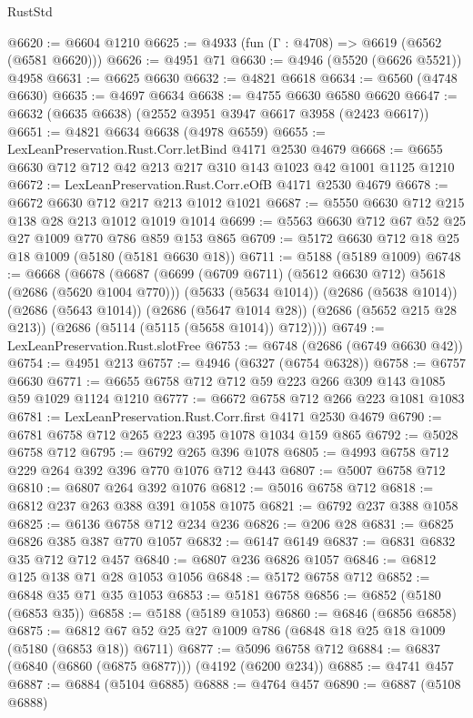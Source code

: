 \begin{lexlean}{RustStd}
\begin{coremodule}
@6620 := @6604 @1210
@6625 := @4933 (fun (Γ : @4708) => @6619 (@6562 (@6581 @6620)))
@6626 := @4951 @71
@6630 := @4946 (@5520 (@6626 @5521)) @4958
@6631 := @6625 @6630
@6632 := @4821 @6618
@6634 := @6560 (@4748 @6630)
@6635 := @4697 @6634
@6638 := @4755 @6630 @6580 @6620
@6647 := @6632 (@6635 @6638) (@2552 @3951 @3947 @6617 @3958 (@2423 @6617))
@6651 := @4821 @6634 @6638 (@4978 @6559)
@6655 := LexLeanPreservation.Rust.Corr.letBind @4171 @2530 @4679
@6668 := @6655 @6630 @712 @712 @42 @213 @217 @310 @143 @1023 @42 @1001 @1125 @1210
@6672 := LexLeanPreservation.Rust.Corr.eOfB @4171 @2530 @4679
@6678 := @6672 @6630 @712 @217 @213 @1012 @1021
@6687 := @5550 @6630 @712 @215 @138 @28 @213 @1012 @1019 @1014
@6699 := @5563 @6630 @712 @67 @52 @25 @27 @1009 @770 @786 @859 @153 @865
@6709 := @5172 @6630 @712 @18 @25 @18 @1009 (@5180 (@5181 @6630 @18))
@6711 := @5188 (@5189 @1009)
@6748 := @6668
    (@6678
      (@6687
        (@6699 (@6709 @6711) (@5612 @6630 @712) @5618 (@2686 (@5620 @1004 @770)))
        (@5633 (@5634 @1014))
        (@2686 (@5638 @1014))
        (@2686 (@5643 @1014))
        (@2686 (@5647 @1014 @28))
        (@2686 (@5652 @215 @28 @213))
        (@2686 (@5114 (@5115 (@5658 @1014)) @712))))
@6749 := LexLeanPreservation.Rust.slotFree
@6753 := @6748 (@2686 (@6749 @6630 @42))
@6754 := @4951 @213
@6757 := @4946 (@6327 (@6754 @6328))
@6758 := @6757 @6630
@6771 := @6655 @6758 @712 @712 @59 @223 @266 @309 @143 @1085 @59 @1029 @1124 @1210
@6777 := @6672 @6758 @712 @266 @223 @1081 @1083
@6781 := LexLeanPreservation.Rust.Corr.first @4171 @2530 @4679
@6790 := @6781 @6758 @712 @265 @223 @395 @1078 @1034 @159 @865
@6792 := @5028 @6758 @712
@6795 := @6792 @265 @396 @1078
@6805 := @4993 @6758 @712 @229 @264 @392 @396 @770 @1076 @712 @443
@6807 := @5007 @6758 @712
@6810 := @6807 @264 @392 @1076
@6812 := @5016 @6758 @712
@6818 := @6812 @237 @263 @388 @391 @1058 @1075
@6821 := @6792 @237 @388 @1058
@6825 := @6136 @6758 @712 @234 @236
@6826 := @206 @28
@6831 := @6825 @6826 @385 @387 @770 @1057
@6832 := @6147 @6149
@6837 := @6831 @6832 @35 @712 @712 @457
@6840 := @6807 @236 @6826 @1057
@6846 := @6812 @125 @138 @71 @28 @1053 @1056
@6848 := @5172 @6758 @712
@6852 := @6848 @35 @71 @35 @1053
@6853 := @5181 @6758
@6856 := @6852 (@5180 (@6853 @35))
@6858 := @5188 (@5189 @1053)
@6860 := @6846 (@6856 @6858)
@6875 := @6812 @67 @52 @25 @27 @1009 @786 (@6848 @18 @25 @18 @1009 (@5180 (@6853 @18)) @6711)
@6877 := @5096 @6758 @712
@6884 := @6837 (@6840 (@6860 (@6875 @6877))) (@4192 (@6200 @234))
@6885 := @4741 @457
@6887 := @6884 (@5104 @6885)
@6888 := @4764 @457
@6890 := @6887 (@5108 @6888)

\end{coremodule}
\end{lexlean}
